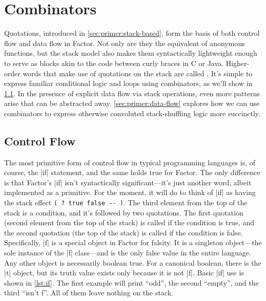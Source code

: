 \section{Combinators}\label{sec:primer:combinators}

Quotations, introduced in \cref{sec:primer:stack-based}, form the basis of both
control flow and data flow in Factor.  Not only are they the equivalent of
anonymous functions, but the stack model also makes them syntactically
lightweight enough to serve as blocks akin to the code between curly braces in
C or Java.  Higher-order words that make use of quotations on the stack are
called .  It's simple to express familiar conditional logic
and loops using combinators, as we'll show in \cref{sec:primer:control-flow}.
In the presence of explicit data flow via stack operations, even more patterns
arise that can be abstracted away.  \cref{sec:primer:data-flow} explores how we
can use combinators to express otherwise convoluted stack-shuffling logic more
succinctly.

\subsection{Control Flow}\label{sec:primer:control-flow}


The most primitive form of control flow in typical programming languages is, of
course, the |if| statement, and the same holds true for Factor.  The
only difference is that Factor's \factor|if| isn't syntactically
significant---it's just another word, albeit implemented as a primitive.  For
the moment, it will do to think of \factor|if| as having the stack effect
%
\Verb|( ? true false -- )|.
%
The third element from the top of the stack is a condition, and it's followed
by two quotations.  The first quotation (second element from the top of the
stack) is called if the condition is true, and the second quotation (the top of
the stack) is called if the condition is false.  Specifically, \factor|f| is a
special object in Factor for falsity.  It is a singleton object---the sole
instance of the \factor|f| class---and is the only false value in the entire
language.  Any other object is necessarily boolean true.  For a canonical
boolean, there is the \factor|t| object, but its truth value exists only
because it is not \factor|f|.  Basic \factor|if| use is shown in
\cref{lst:if}.  The first example will print ``odd'', the second
``empty'', and the third ``isn't f''.  All of them leave nothing on the stack.

